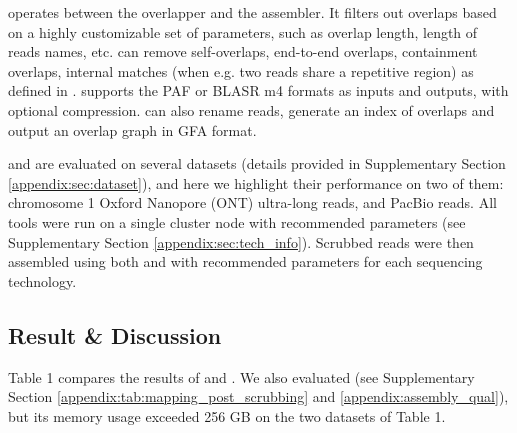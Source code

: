 \documentclass[./main.tex]{subfiles}
\begin{document}
\textbf{\fpa} operates between the overlapper and the assembler. It filters out overlaps based on a highly customizable set of parameters, such as overlap length, length of reads names, etc. \fpa can remove self-overlaps, end-to-end overlaps, containment overlaps, internal matches (when e.g. two reads share a repetitive region) as defined in \citep{minimap}. 
\fpa supports the PAF or BLASR m4 formats as inputs and outputs, with optional compression. %
\fpa can also rename reads, generate an index of overlaps and output an overlap graph in GFA format.




\yacrd and \fpa are evaluated on several datasets (details provided in Supplementary Section \ref{appendix:sec:dataset}), and here we highlight their performance on two of them: 
\hsapiens chromosome 1 Oxford Nanopore (ONT) ultra-long reads, and \celegans PacBio reads.
All tools were run on a single cluster node %
 with recommended parameters (see Supplementary Section \ref{appendix:sec:tech_info}). Scrubbed reads were then assembled using both \miniasm and \wtdbg with recommended parameters for each sequencing technology. 


\subsection{Result \& Discussion}

Table 1 compares the results of \textbf{\yacrd} and \dascrubber. 
We also evaluated \miniscrub (see Supplementary Section \ref{appendix:tab:mapping_post_scrubbing} and \ref{appendix:assembly_qual}), but its memory usage exceeded 256 GB on the two datasets of Table 1. %
\end{document}
